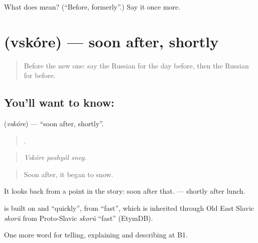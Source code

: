 \begin{tcolorbox}[breakable,colback=teal!4,colframe=teal!35!black,title={Before you move on}]
What does  mean? (\textquotedblleft{}Before, formerly\textquotedblright{}.) Say it once more.
\end{tcolorbox}
\section[\texorpdfstring{\ru{вскоре} (vskóre)}{вскоре (vskóre)}]{ (vskóre) — soon after, shortly}

\label{lesson:RU-C272-vskore}



\begin{quote}
Before the new one: say the Russian for the day before, then the Russian for before.
\end{quote}

\subsection*{You'll want to know: }
\textbf{} (\emph{vskóre}) — \textquotedblleft{}soon after, shortly\textquotedblright{}.

\begin{quote}
  .
\end{quote}

\begin{quote}
\emph{Vskóre poshyól sneg.}
\end{quote}

\begin{quote}
Soon after, it began to snow.
\end{quote}

It looks back from a point in the story: soon after that. \emph{  } — shortly after lunch.

\begin{cousinweb}
\emph{} is built on \emph{} and \emph{} \textquotedblleft{}quickly\textquotedblright{}, from \emph{} \textquotedblleft{}fast\textquotedblright{}, which is inherited through Old East Slavic \emph{skorŭ} from Proto-Slavic \emph{skorŭ} \textquotedblleft{}fast\textquotedblright{} (EtymDB).
\end{cousinweb}

\begin{grammarlens}[title={What you've built}]
One more word for telling, explaining and describing at B1.
\end{grammarlens}

